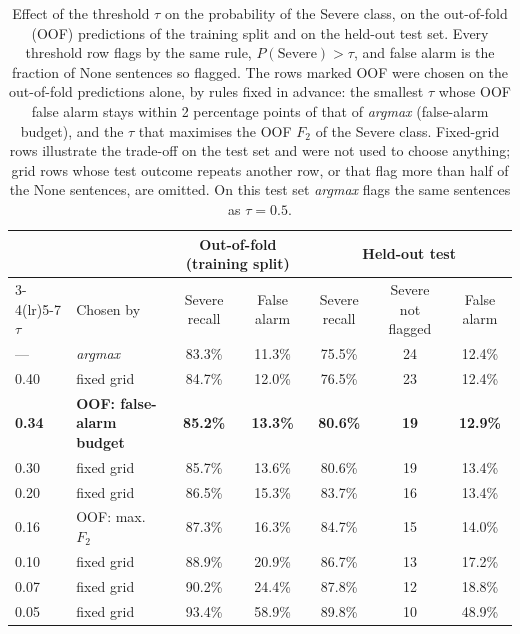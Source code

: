\begin{table}[!t]
\centering
\caption{Effect of the threshold $\tau$ on the probability of the Severe class, on the out-of-fold (OOF) predictions of the training split and on the held-out test set. Every threshold row flags by the same rule, $P(\text{Severe}) > \tau$, and false alarm is the fraction of None sentences so flagged. The rows marked OOF were chosen on the out-of-fold predictions alone, by rules fixed in advance: the smallest $\tau$ whose OOF false alarm stays within 2 percentage points of that of \emph{argmax} (false-alarm budget), and the $\tau$ that maximises the OOF $F_2$ of the Severe class. Fixed-grid rows illustrate the trade-off on the test set and were not used to choose anything; grid rows whose test outcome repeats another row, or that flag more than half of the None sentences, are omitted. On this test set \emph{argmax} flags the same sentences as $\tau = 0.5$.}
\label{tab:limiar}
\begin{tabular}{llccccc}
\toprule
 & & \multicolumn{2}{c}{Out-of-fold (training split)} & \multicolumn{3}{c}{Held-out test} \\
\cmidrule(lr){3-4}\cmidrule(lr){5-7}
$\tau$ & Chosen by & Severe recall & False alarm & Severe recall & Severe not flagged & False alarm \\
\midrule
--- & \emph{argmax} & 83.3\% & 11.3\% & 75.5\% & 24 & 12.4\% \\
0.40 & fixed grid & 84.7\% & 12.0\% & 76.5\% & 23 & 12.4\% \\
\textbf{0.34} & \textbf{OOF: false-alarm budget} & \textbf{85.2\%} & \textbf{13.3\%} & \textbf{80.6\%} & \textbf{19} & \textbf{12.9\%} \\
0.30 & fixed grid & 85.7\% & 13.6\% & 80.6\% & 19 & 13.4\% \\
0.20 & fixed grid & 86.5\% & 15.3\% & 83.7\% & 16 & 13.4\% \\
0.16 & OOF: max.\ $F_2$ & 87.3\% & 16.3\% & 84.7\% & 15 & 14.0\% \\
0.10 & fixed grid & 88.9\% & 20.9\% & 86.7\% & 13 & 17.2\% \\
0.07 & fixed grid & 90.2\% & 24.4\% & 87.8\% & 12 & 18.8\% \\
0.05 & fixed grid & 93.4\% & 58.9\% & 89.8\% & 10 & 48.9\% \\
\bottomrule
\end{tabular}
\end{table}
